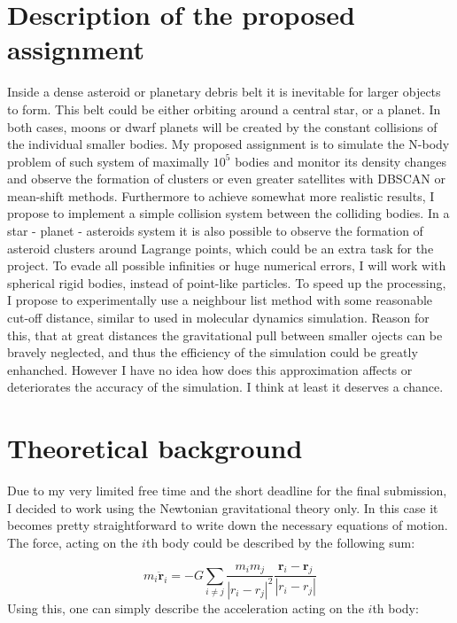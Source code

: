 \begin{multicols}{2}
\section{Description of the proposed assignment}
Inside a dense asteroid or planetary debris belt it is inevitable for larger objects to form. This belt could be either orbiting around a central star, or a planet. In both cases, moons or dwarf planets will be created by the constant collisions of the individual smaller bodies. My proposed assignment is to simulate the N-body problem of such system of maximally $10^5$ bodies and monitor its density changes and observe the formation of clusters or even greater satellites with DBSCAN or mean-shift methods. Furthermore to achieve somewhat more realistic results, I propose to implement a simple collision system between the colliding bodies. In a star - planet - asteroids system it is also possible to observe the formation of asteroid clusters around Lagrange points, which could be an extra task for the project. \newline
To evade all possible infinities or huge numerical errors, I will work with spherical rigid bodies, instead of point-like particles. To speed up the processing, I propose to experimentally use a neighbour list method with some reasonable cut-off distance, similar to used in molecular dynamics simulation. Reason for this, that at great distances the gravitational pull between smaller ojects can be bravely neglected, and thus the efficiency of the simulation could be greatly enhanched. However I have no idea how does this approximation affects or deteriorates the accuracy of the simulation. I think at least it deserves a chance.

\section{Theoretical background}
Due to my very limited free time and the short deadline for the final submission, I decided to work using the Newtonian gravitational theory only. In this case it becomes pretty straightforward to write down the necessary equations of motion. The force, acting on the $i$th body could be described by the following sum:

\begin{equation}
m_{i} \boldsymbol{\ddot{r}}_{i}
=
- G \sum_{i \neq j} \frac{m_{i} m_{j}}{\left| r_{i} - r_{j} \right|^{2}} \frac{\boldsymbol{r}_{i} - \boldsymbol{r}_{j}}{\left| r_{i} - r_{j} \right|}
\end{equation}
Using this, one can simply describe the acceleration acting on the $i$th body:


\end{multicols}
